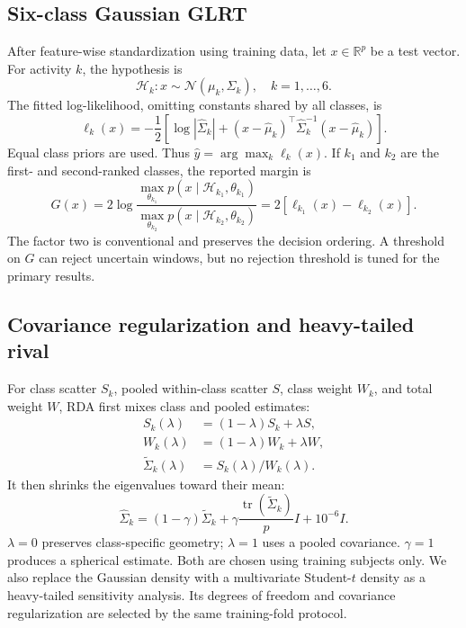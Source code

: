 \documentclass[a4paper,conference,10pt]{IEEEtran}
\begin{document}
\subsection{Six-class Gaussian GLRT}
After feature-wise standardization using training data, let $x\in\mathbb{R}^p$ be a test vector. For activity $k$, the hypothesis is
\begin{equation}
    \mathcal H_k:x\sim\mathcal N(\mu_k,\Sigma_k),\quad k=1,\ldots,6.
\end{equation}
The fitted log-likelihood, omitting constants shared by all classes, is
\begin{equation}
 \ell_k(x)=-\frac{1}{2}\left[
 \log|\widehat\Sigma_k|+
 (x-\widehat\mu_k)^\top\widehat\Sigma_k^{-1}(x-\widehat\mu_k)
 \right].
 \label{eq:likelihood}
\end{equation}
Equal class priors are used. Thus $\hat y=\arg\max_k\ell_k(x)$. If $k_1$ and $k_2$ are the first- and second-ranked classes, the reported margin is
\begin{equation}
 G(x)=2\log\frac{\max_{\theta_{k_1}}p(x\mid\mathcal H_{k_1},\theta_{k_1})}
 {\max_{\theta_{k_2}}p(x\mid\mathcal H_{k_2},\theta_{k_2})}
 =2[\ell_{k_1}(x)-\ell_{k_2}(x)].
 \label{eq:glr}
\end{equation}
The factor two is conventional and preserves the decision ordering. A threshold on $G$ can reject uncertain windows, but no rejection threshold is tuned for the primary results.

\subsection{Covariance regularization and heavy-tailed rival}
For class scatter $S_k$, pooled within-class scatter $S$, class weight $W_k$, and total weight $W$, RDA first mixes class and pooled estimates:
\begin{align}
 S_k(\lambda)&=(1-\lambda)S_k+\lambda S,\\
 W_k(\lambda)&=(1-\lambda)W_k+\lambda W,\\
 \widetilde\Sigma_k(\lambda)&=S_k(\lambda)/W_k(\lambda).
\end{align}
It then shrinks the eigenvalues toward their mean:
\begin{equation}
 \widehat\Sigma_k=(1-\gamma)\widetilde\Sigma_k+
 \gamma\frac{\operatorname{tr}(\widetilde\Sigma_k)}{p}I+10^{-6}I.
 \label{eq:rda}
\end{equation}
$\lambda=0$ preserves class-specific geometry; $\lambda=1$ uses a pooled covariance. $\gamma=1$ produces a spherical estimate. Both are chosen using training subjects only. We also replace the Gaussian density with a multivariate Student-$t$ density as a heavy-tailed sensitivity analysis. Its degrees of freedom and covariance regularization are selected by the same training-fold protocol.
\end{document}
